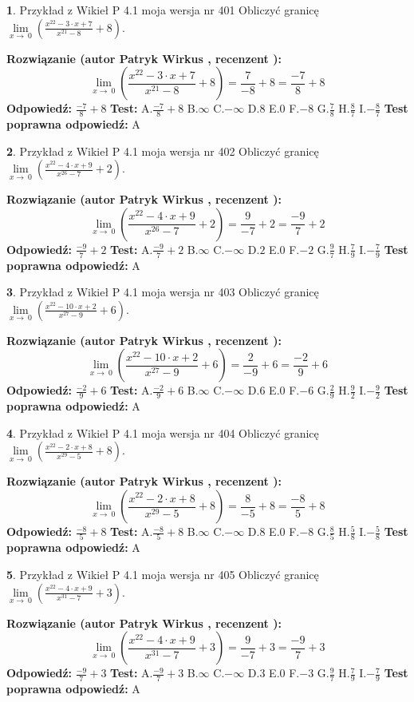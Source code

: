 \documentclass[12pt, a4paper]{article}
\theoremstyle{definition} %
\newtheorem{zad}{}
\newcommand{\zadStart}[1]{\begin{zad}#1\newline}
\newcommand{\zadStop}{\end{zad}}
\newcommand{\rozwStart}[2]{\noindent \textbf{Rozwiązanie (autor #1 , recenzent #2): }\newline}
\newcommand{\rozwStop}{\newline}
\newcommand{\odpStart}{\noindent \textbf{Odpowiedź:}\newline}
\newcommand{\odpStop}{\newline}
\newcommand{\testStart}{\noindent \textbf{Test:}\newline}
\newcommand{\testStop}{\newline}
\newcommand{\kluczStart}{\noindent \textbf{Test poprawna odpowiedź:}\newline}
\newcommand{\kluczStop}{\newline}
\begin{document}
\zadStart{Przykład z Wikieł P 4.1 moja wersja nr 401}
Obliczyć granicę $\lim\limits_{x\to\ 0}(\frac{x^{22}-3 \cdot x +7}{x^{21}-8}+8)$.
\zadStop
\rozwStart{Patryk Wirkus}{}
$$\lim\limits_{x\to\ 0}(\frac{x^{22}-3 \cdot x +7}{x^{21}-8}+8)=\frac{7}{-8}+8=\frac{-7}{8}+8$$
\rozwStop
\odpStart
$\frac{-7}{8}+8$
\odpStop
\testStart
A.$\frac{-7}{8}+8$
B.$\infty$
C.$-\infty$
D.$8$
E.$0$
F.$-8$
G.$\frac{7}{8}$
H.$\frac{8}{7}$
I.$-\frac{8}{7}$
\testStop
\kluczStart
A
\kluczStop



\zadStart{Przykład z Wikieł P 4.1 moja wersja nr 402}
Obliczyć granicę $\lim\limits_{x\to\ 0}(\frac{x^{22}-4 \cdot x +9}{x^{26}-7}+2)$.
\zadStop
\rozwStart{Patryk Wirkus}{}
$$\lim\limits_{x\to\ 0}(\frac{x^{22}-4 \cdot x +9}{x^{26}-7}+2)=\frac{9}{-7}+2=\frac{-9}{7}+2$$
\rozwStop
\odpStart
$\frac{-9}{7}+2$
\odpStop
\testStart
A.$\frac{-9}{7}+2$
B.$\infty$
C.$-\infty$
D.$2$
E.$0$
F.$-2$
G.$\frac{9}{7}$
H.$\frac{7}{9}$
I.$-\frac{7}{9}$
\testStop
\kluczStart
A
\kluczStop



\zadStart{Przykład z Wikieł P 4.1 moja wersja nr 403}
Obliczyć granicę $\lim\limits_{x\to\ 0}(\frac{x^{22}-10 \cdot x +2}{x^{27}-9}+6)$.
\zadStop
\rozwStart{Patryk Wirkus}{}
$$\lim\limits_{x\to\ 0}(\frac{x^{22}-10 \cdot x +2}{x^{27}-9}+6)=\frac{2}{-9}+6=\frac{-2}{9}+6$$
\rozwStop
\odpStart
$\frac{-2}{9}+6$
\odpStop
\testStart
A.$\frac{-2}{9}+6$
B.$\infty$
C.$-\infty$
D.$6$
E.$0$
F.$-6$
G.$\frac{2}{9}$
H.$\frac{9}{2}$
I.$-\frac{9}{2}$
\testStop
\kluczStart
A
\kluczStop



\zadStart{Przykład z Wikieł P 4.1 moja wersja nr 404}
Obliczyć granicę $\lim\limits_{x\to\ 0}(\frac{x^{22}-2 \cdot x +8}{x^{29}-5}+8)$.
\zadStop
\rozwStart{Patryk Wirkus}{}
$$\lim\limits_{x\to\ 0}(\frac{x^{22}-2 \cdot x +8}{x^{29}-5}+8)=\frac{8}{-5}+8=\frac{-8}{5}+8$$
\rozwStop
\odpStart
$\frac{-8}{5}+8$
\odpStop
\testStart
A.$\frac{-8}{5}+8$
B.$\infty$
C.$-\infty$
D.$8$
E.$0$
F.$-8$
G.$\frac{8}{5}$
H.$\frac{5}{8}$
I.$-\frac{5}{8}$
\testStop
\kluczStart
A
\kluczStop



\zadStart{Przykład z Wikieł P 4.1 moja wersja nr 405}
Obliczyć granicę $\lim\limits_{x\to\ 0}(\frac{x^{22}-4 \cdot x +9}{x^{31}-7}+3)$.
\zadStop
\rozwStart{Patryk Wirkus}{}
$$\lim\limits_{x\to\ 0}(\frac{x^{22}-4 \cdot x +9}{x^{31}-7}+3)=\frac{9}{-7}+3=\frac{-9}{7}+3$$
\rozwStop
\odpStart
$\frac{-9}{7}+3$
\odpStop
\testStart
A.$\frac{-9}{7}+3$
B.$\infty$
C.$-\infty$
D.$3$
E.$0$
F.$-3$
G.$\frac{9}{7}$
H.$\frac{7}{9}$
I.$-\frac{7}{9}$
\testStop
\kluczStart
A
\kluczStop
\end{document}
